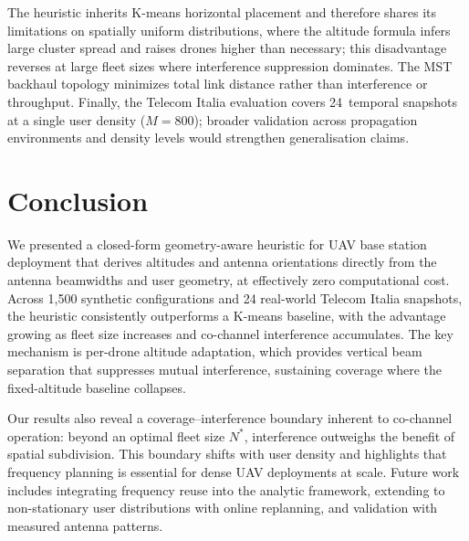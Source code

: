 \documentclass[conference]{IEEEtran}
\begin{document}
The heuristic inherits K-means horizontal placement and therefore shares its limitations on spatially uniform distributions, where the altitude formula infers large cluster spread and raises drones higher than necessary; this disadvantage reverses at large fleet sizes where interference suppression dominates. The MST backhaul topology minimizes total link distance rather than interference or throughput. Finally, the Telecom Italia evaluation covers 24~temporal snapshots at a single user density ($M{=}800$); broader validation across propagation environments and density levels would strengthen generalisation claims.

\section{Conclusion}
\label{sec:conclusion}

We presented a closed-form geometry-aware heuristic for UAV base station deployment that derives altitudes and antenna orientations directly from the antenna beamwidths and user geometry, at effectively zero computational cost.
Across 1{,}500 synthetic configurations and 24 real-world Telecom Italia snapshots, the heuristic consistently outperforms a K-means baseline, with the advantage growing as fleet size increases and co-channel interference accumulates.
The key mechanism is per-drone altitude adaptation, which provides vertical beam separation that suppresses mutual interference, sustaining coverage where the fixed-altitude baseline collapses.

Our results also reveal a coverage--interference boundary inherent to co-channel operation: beyond an optimal fleet size $N^*$, interference outweighs the benefit of spatial subdivision.
This boundary shifts with user density and highlights that frequency planning is essential for dense UAV deployments at scale.
Future work includes integrating frequency reuse into the analytic framework, extending to non-stationary user distributions with online replanning, and validation with measured antenna patterns.



\end{document}

